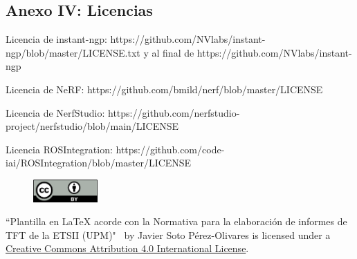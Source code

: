 \documentclass[a4paper, 12pt, spanish, twoside]{article}
\begin{document}

\clearpage




\newpage
\subsection{Anexo IV: Licencias} \label{sec:anexo4}

Licencia de instant-ngp: https://github.com/NVlabs/instant-ngp/blob/master/LICENSE.txt y al final de https://github.com/NVlabs/instant-ngp

Licencia de NeRF: https://github.com/bmild/nerf/blob/master/LICENSE

Licencia de NerfStudio: https://github.com/nerfstudio-project/nerfstudio/blob/main/LICENSE

Licencia ROSIntegration: https://github.com/code-iai/ROSIntegration/blob/master/LICENSE

\begin{figure}
    \vspace{-\baselineskip}
    \href{http://creativecommons.org/licenses/by/4.0/}{\includegraphics[width=0.22\textwidth]{cc-by.png}}
\end{figure} 

\vspace*{\fill}
``Plantilla en LaTeX acorde con la Normativa para la elaboración de informes de TFT de la ETSII (UPM)" \ by Javier Soto Pérez-Olivares is licensed under a \href{http://creativecommons.org/licenses/by/4.0/}{Creative Commons Attribution 4.0 International License}.

\clearpage



\end{document}
